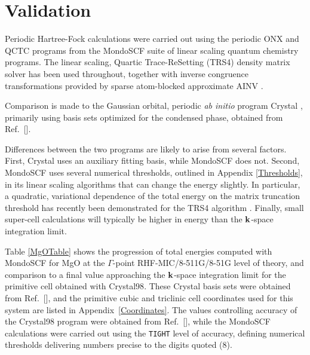 \documentclass[prb,aps,nobibnotes,twocolumn,doublespace,twocolumngrid,superbib]{revtex4}
\begin{document}
\section{Validation} \label{validation}

Periodic Hartree-Fock calculations were carried out using the periodic {\sc ONX} and {\sc QCTC}
programs from the {\sc MondoSCF} suite of linear scaling quantum chemistry programs.
The linear scaling, Quartic Trace-ReSetting ({\sc TRS4}) density matrix solver has been used throughout, 
together with inverse congruence transformations provided by sparse atom-blocked approximate 
{\sc AINV} \cite{MBenzi01}.  

Comparison is made to the Gaussian orbital, periodic {\em ab initio} program {\sc Crystal} \cite{Crystal98}, 
primarily using basis sets optimized for the condensed phase, obtained  from Ref.~[].

Differences between the two programs are likely to arise from several factors.  First, {\sc Crystal}
uses an auxiliary fitting basis, while {\sc MondoSCF} does not.  Second, {\sc MondoSCF} uses several 
numerical thresholds, outlined in Appendix \ref{Thresholds}, in its linear scaling algorithms that can 
change the energy slightly.   In particular, a quadratic, variational dependence of the total energy
on the  matrix truncation threshold has recently been demonstrated for the {\sc TRS4} algorithm 
\cite{ANiklasson03}.  Finally, small super-cell calculations will typically be higher in energy than the 
${\bf k}$-space integration limit.  

Table \ref{MgOTable} shows the progression of total energies computed with {\sc MondoSCF} 
for MgO at the $\Gamma$-point RHF-MIC/8-511G/8-51G level of theory, and comparison to
a final value approaching the ${\bf k}$-space integration limit for the primitive cell obtained 
with {\sc Crystal98}.   These {\sc Crystal} basis sets were obtained from Ref.~[],
and the primitive cubic and triclinic cell coordinates used for this system are listed in 
Appendix~\ref{Coordinates}.   The values controlling accuracy of the {\sc Crystal98} program were 
obtained from Ref.~[], while the {\sc MondoSCF} calculations were 
carried out using the {\tt TIGHT} level of accuracy, defining numerical thresholds 
delivering numbers precise to the digits quoted (8). 
\end{document}

